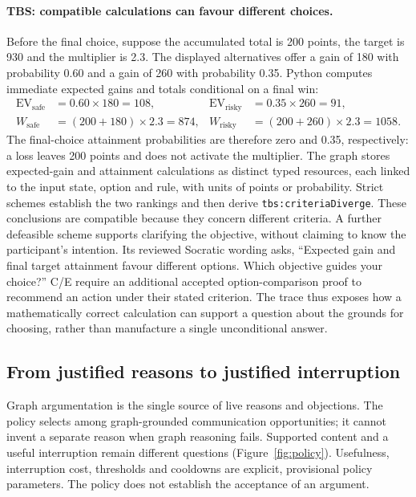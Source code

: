 \documentclass[11pt,a4paper]{article}
\begin{document}
\paragraph{TBS: compatible calculations can favour different choices.} Before the final choice, suppose the accumulated total is 200 points, the target is 930 and the multiplier is 2.3. The displayed alternatives offer a gain of 180 with probability 0.60 and a gain of 260 with probability 0.35. Python computes immediate expected gains and totals conditional on a final win:
\begin{align*}
\mathrm{EV}_{\mathrm{safe}} &= 0.60\times180=108,
& \mathrm{EV}_{\mathrm{risky}} &= 0.35\times260=91,\\
W_{\mathrm{safe}} &= (200+180)\times2.3=874,
& W_{\mathrm{risky}} &= (200+260)\times2.3=1058.
\end{align*}
The final-choice attainment probabilities are therefore zero and 0.35, respectively: a loss leaves 200 points and does not activate the multiplier. The graph stores expected-gain and attainment calculations as distinct typed resources, each linked to the input state, option and rule, with units of points or probability. Strict schemes establish the two rankings and then derive \texttt{tbs:criteriaDiverge}. These conclusions are compatible because they concern different criteria. A further defeasible scheme supports clarifying the objective, without claiming to know the participant's intention. Its reviewed Socratic wording asks, ``Expected gain and final target attainment favour different options. Which objective guides your choice?'' C/E require an additional accepted option-comparison proof to recommend an action under their stated criterion. The trace thus exposes how a mathematically correct calculation can support a question about the grounds for choosing, rather than manufacture a single unconditional answer.

\subsection{From justified reasons to justified interruption}
Graph argumentation is the single source of live reasons and objections. The policy selects among graph-grounded communication opportunities; it cannot invent a separate reason when graph reasoning fails. Supported content and a useful interruption remain different questions (Figure~\ref{fig:policy}). Usefulness, interruption cost, thresholds and cooldowns are explicit, provisional policy parameters. The policy does not establish the acceptance of an argument.
\end{document}
